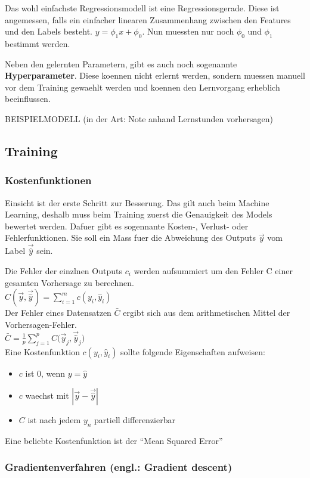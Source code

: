 \documentclass[../main]{subfiles}
\begin{document}
Das wohl einfachste Regressionsmodell ist eine Regressionsgerade. Diese ist angemessen, falls ein einfacher linearen Zusammenhang zwischen den Features und den Labels besteht.
$y=\phi_1x + \phi_0$. Nun muessten nur noch $\phi_0$ und $\phi_1$ bestimmt werden. 

Neben den gelernten Parametern, gibt es auch noch sogenannte \textbf{Hyperparameter}. Diese koennen nicht erlernt werden, sondern muessen manuell vor dem Training gewaehlt werden und koennen den Lernvorgang erheblich beeinflussen.

BEISPIELMODELL (in der Art: Note anhand Lernstunden vorhersagen)

\subsection{Training}
\subsubsection{Kostenfunktionen}
Einsicht ist der erste Schritt zur Besserung. Das gilt auch beim Machine Learning, deshalb muss beim Training zuerst die Genauigkeit des Models bewertet werden.
Dafuer gibt es sogennante Kosten-, Verlust- oder Fehlerfunktionen. Sie soll ein Mass fuer die Abweichung des Outputs $\vec{y}$ vom Label $\vec{\hat{y}}$ sein.\par

Die Fehler der einzlnen Outputs $c_i$ werden aufsummiert um den Fehler C einer gesamten Vorhersage zu berechnen.\\
$C(\vec{y},\vec{\hat{y}})=\displaystyle\sum_{i=1}^{m} c(y_i, \hat{y}_i)$\\
Der Fehler eines Datensatzen $\bar{C}$ ergibt sich aus dem arithmetischen Mittel der Vorhersagen-Fehler.\\
$\bar{C} = \frac{1}{p}\displaystyle\sum_{j=1}^{p} C\Big(\vec{y}_j,\vec{\hat{y}}_j\Big)$\\
%
Eine Kostenfunktion $c(y_i,\hat{y}_i)$ sollte folgende Eigenschaften aufweisen:
\begin{itemize}
    \item{$c$ ist $0$, wenn $y = \hat{y}$}
    \item{$c$ waechst mit $|\vec{y}-\vec{\hat{y}}|$}
    \item{$C$ ist nach jedem $y_n$ partiell differenzierbar}
\end{itemize}

Eine beliebte Kostenfunktion ist der ``Mean Squared Error''
\pagebreak
\subsubsection{Gradientenverfahren (engl.: Gradient descent)}
\end{document}

